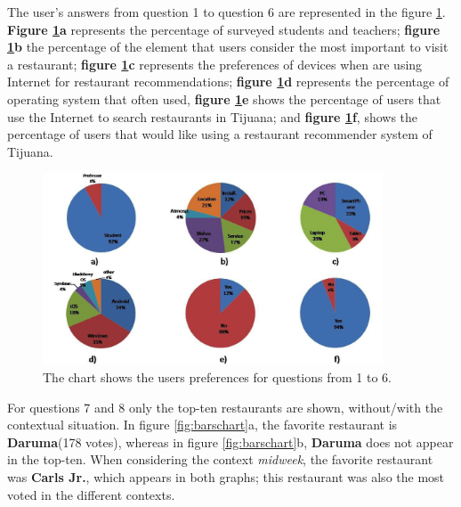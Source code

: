 The user's answers from question 1 to question 6 are represented in
the figure \ref{fig:cakeschart}. \textbf{Figure \ref{fig:cakeschart}a}
represents the percentage of surveyed students and teachers;
\textbf{figure \ref{fig:cakeschart}b}  the percentage of the element
that users consider the most important to visit a restaurant;
\textbf{figure \ref{fig:cakeschart}c} represents the preferences of
devices when are using Internet for restaurant recommendations;
\textbf{figure \ref{fig:cakeschart}d} represents the percentage of
operating system that often used, \textbf{figure
	\ref{fig:cakeschart}e} shows the percentage of users that use the
Internet to search restaurants in Tijuana; and \textbf{figure
	\ref{fig:cakeschart}f}, shows the percentage of users that would like
using a restaurant recommender system of Tijuana.
\begin{figure}
	\captionsetup{justification=centering,margin=2cm}
	\centering
	\setlength\fboxsep{0pt}
	\includegraphics[width=0.9\textwidth]{img/cakes.png}
	\caption{The chart shows the users preferences for questions from 1 to 6.}
	\label{fig:cakeschart}     
\end{figure}
For questions 7 and 8 only the top-ten restaurants are shown,
without/with the contextual situation. In figure \ref{fig:barschart}a,
the favorite restaurant is \textbf{Daruma}(178 votes),  whereas in
figure \ref{fig:barschart}b, \textbf{Daruma} does not appear in the
top-ten. When considering the context \textit{midweek}, the favorite
restaurant was \textbf{Carls Jr.}, which appears in both graphs; this
restaurant was also the most voted in the different contexts.

